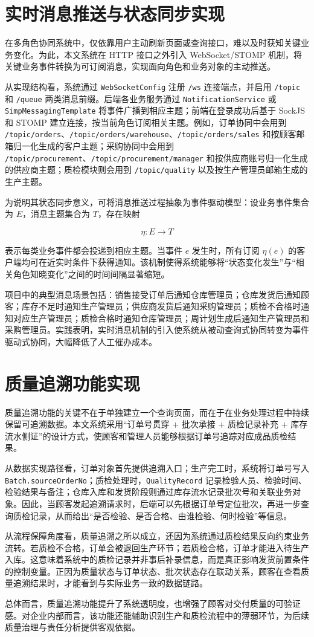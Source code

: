 \section{实时消息推送与状态同步实现}

在多角色协同系统中，仅依靠用户主动刷新页面或查询接口，难以及时获知关键业务变化。为此，本文系统在 HTTP 接口之外引入 WebSocket/STOMP 机制，将关键业务事件转换为可订阅消息，实现面向角色和业务对象的主动推送。

从实现结构看，系统通过 \texttt{WebSocketConfig} 注册 \texttt{/ws} 连接端点，并启用 \texttt{/topic} 和 \texttt{/queue} 两类消息前缀。后端各业务服务通过 \texttt{NotificationService} 或 \texttt{SimpMessagingTemplate} 将事件广播到相应主题；前端在登录成功后基于 SockJS 和 STOMP 建立连接，按当前角色订阅相关主题。例如，订单协同中会用到 \texttt{/topic/orders}、\texttt{/topic/orders/warehouse}、\texttt{/topic/orders/sales} 和按顾客邮箱归一化生成的客户主题；采购协同中会用到 \texttt{/topic/procurement}、\texttt{/topic/procurement/manager} 和按供应商账号归一化生成的供应商主题；质检模块则会用到 \texttt{/topic/quality} 以及按生产管理员邮箱生成的生产主题。

为说明其状态同步意义，可将消息推送过程抽象为事件驱动模型：设业务事件集合为 $E$，消息主题集合为 $T$，存在映射

\begin{equation}
\eta: E \rightarrow T
\end{equation}

表示每类业务事件都会投递到相应主题。当事件 $e$ 发生时，所有订阅 $\eta(e)$ 的客户端均可在近实时条件下获得通知。该机制使得系统能够将“状态变化发生”与“相关角色知晓变化”之间的时间间隔显著缩短。

项目中的典型消息场景包括：销售接受订单后通知仓库管理员；仓库发货后通知顾客；库存不足时通知生产管理员；供应商发货后通知采购管理员；质检不合格时通知对应生产管理员；质检合格时通知仓库管理员；周计划生成后通知生产管理员和采购管理员。实践表明，实时消息机制的引入使系统从被动查询式协同转变为事件驱动式协同，大幅降低了人工催办成本。

\section{质量追溯功能实现}

质量追溯功能的关键不在于单独建立一个查询页面，而在于在业务处理过程中持续保留可追溯数据。本文系统采用“订单号贯穿 + 批次承接 + 质检记录补充 + 库存流水侧证”的设计方式，使顾客和管理人员能够根据订单号追踪对应成品质检结果。

从数据实现路径看，订单对象首先提供追溯入口；生产完工时，系统将订单号写入 \texttt{Batch.sourceOrderNo}；质检处理时，\texttt{QualityRecord} 记录检验人员、检验时间、检验结果与备注；仓库入库和发货阶段则通过库存流水记录批次号和关联业务对象。因此，当顾客发起追溯请求时，后端可以先根据订单号定位批次，再进一步查询质检记录，从而给出“是否检验、是否合格、由谁检验、何时检验”等信息。

从流程保障角度看，质量追溯之所以成立，还因为系统通过质检结果反向约束业务流转。若质检不合格，订单会被退回生产环节；若质检合格，订单才能进入待生产入库。这意味着系统中的质检记录并非事后补录信息，而是真正影响发货前置条件的控制变量。正因为质量状态与订单状态、批次状态存在联动关系，顾客在查看质量追溯结果时，才能看到与实际业务一致的数据链路。

总体而言，质量追溯功能提升了系统透明度，也增强了顾客对交付质量的可验证感。对企业内部而言，该功能还能辅助识别生产和质检流程中的薄弱环节，为后续质量治理与责任分析提供客观依据。

